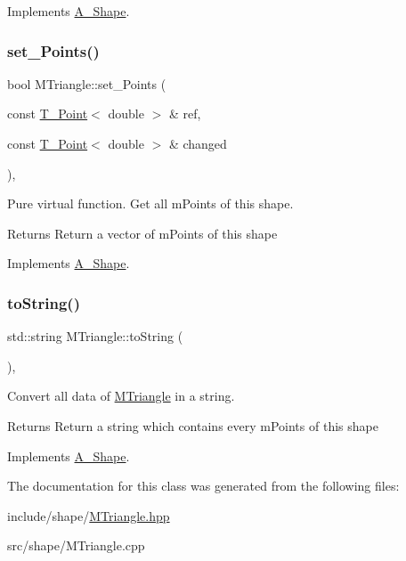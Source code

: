 Implements \hyperlink{classShape_a2dea8616fd40f2d69fd208715921982a}{A_Shape}.

\mbox{\label{classMTriangle_aec40d088d077bfb14f94895be871dfdf}} 
\subsubsection{\texorpdfstring{set\+\_\+\+Points()}{set\_Points()}}
{\footnotesize\ttfamily bool M\+Triangle\+::set\+\_\+\+Points (\begin{DoxyParamCaption}\item[{const \hyperlink{classPoint}{T_Point}$<$ double $>$ \&}]{ref,  }\item[{const \hyperlink{classPoint}{T_Point}$<$ double $>$ \&}]{changed }\end{DoxyParamCaption})\hspace{0.3cm}{\ttfamily [override]}, {\ttfamily [virtual]}}



Pure virtual function. Get all mPoints of this shape.

\begin{DoxyReturn}{Returns}
Return a vector of mPoints of this shape
\end{DoxyReturn}


Implements \hyperlink{classShape_a6eb0d80cccc44cb72b06c61d9780bc6b}{A_Shape}.

\mbox{\label{classMTriangle_a7d1fd825592dffa6ac05b3398a8c105a}} 
\subsubsection{\texorpdfstring{to\+String()}{aToString()}}
{\footnotesize\ttfamily std\+::string M\+Triangle\+::to\+String (\begin{DoxyParamCaption}{ }\end{DoxyParamCaption})\hspace{0.3cm}{\ttfamily [override]}, {\ttfamily [virtual]}}



Convert all data of \hyperlink{classMTriangle}{M\+Triangle} in a string. 

\begin{DoxyReturn}{Returns}
Return a string which contains every mPoints of this shape
\end{DoxyReturn}


Implements \hyperlink{classShape_a98fa87c6dc4c7045fd6897a8f3bc186c}{A_Shape}.



The documentation for this class was generated from the following files\+:\begin{DoxyCompactItemize}
\item 
include/shape/\hyperlink{MTriangle_8hpp}{M\+Triangle.\+hpp}\item 
src/shape/M\+Triangle.\+cpp\end{DoxyCompactItemize}
